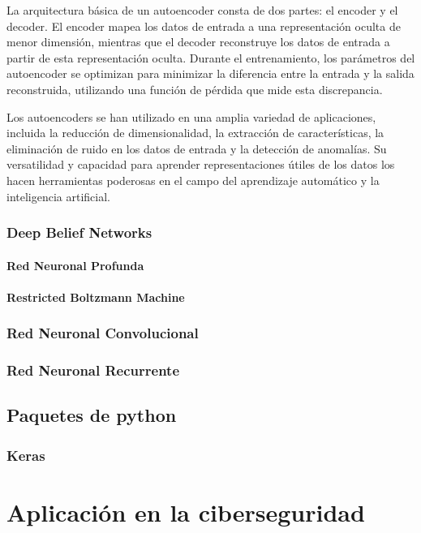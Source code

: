 \documentclass[12pt,a4paper]{book}
\begin{document}
La arquitectura básica de un autoencoder consta de dos partes: el encoder y el decoder. El encoder mapea los datos de entrada a una representación oculta de menor dimensión, mientras que el decoder reconstruye los datos de entrada a partir de esta representación oculta. Durante el entrenamiento, los parámetros del autoencoder se optimizan para minimizar la diferencia entre la entrada y la salida reconstruida, utilizando una función de pérdida que mide esta discrepancia.

Los autoencoders se han utilizado en una amplia variedad de aplicaciones, incluida la reducción de dimensionalidad, la extracción de características, la eliminación de ruido en los datos de entrada y la detección de anomalías. Su versatilidad y capacidad para aprender representaciones útiles de los datos los hacen herramientas poderosas en el campo del aprendizaje automático y la inteligencia artificial.



\subsection{Deep Belief Networks}
\subsubsection{Red Neuronal Profunda}
\subsubsection{Restricted Boltzmann Machine}
\subsection{Red Neuronal Convolucional}
\subsection{Red Neuronal Recurrente}

\section{Paquetes de python} \label{Subsec: 3_3}
\subsection{Keras}



\chapter{Aplicación en la ciberseguridad} \label{Capitulo_3}
\end{document}
